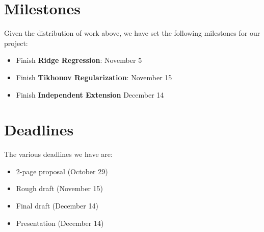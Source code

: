 \documentclass{article}
\begin{document}
    \section{Milestones}

    Given the distribution of work above, we have set the following milestones for our project:

    \begin{itemize}
        \item Finish \textbf{Ridge Regression}: November 5
        \item Finish \textbf{Tikhonov Regularization}: November 15
        \item Finish \textbf{Independent Extension} December 14
    \end{itemize}

    \section{Deadlines}

    The various deadlines we have are:

    \begin{itemize}
        \item 2-page proposal (October 29)
        \item Rough draft (November 15)
        \item Final draft (December 14)
        \item Presentation (December 14)
    \end{itemize}
\end{document}

